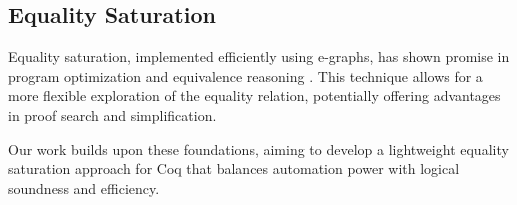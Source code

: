 \subsection{Equality Saturation}

Equality saturation, implemented efficiently using e-graphs, has shown promise in program optimization and equivalence reasoning \cite{egg}. This technique allows for a more flexible exploration of the equality relation, potentially offering advantages in proof search and simplification.

Our work builds upon these foundations, aiming to develop a lightweight equality saturation approach for Coq that balances automation power with logical soundness and efficiency.